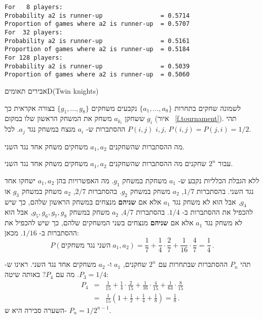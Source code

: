 \sml{}
\begin{verbatim}
For   8 players:
Probability a2 is runner-up                = 0.5714
Proportion of games where a2 is runner-up  = 0.5707
For  32 players:
Probability a2 is runner-up                = 0.5161
Proportion of games where a2 is runner-up  = 0.5184
For 128 players:
Probability a2 is runner-up                = 0.5039
Proportion of games where a2 is runner-up  = 0.5060
\end{verbatim}


\begin{prob}{אבירים תאומים}{D}{(Twin knights)}

לשמונה שחקים בתחרות 
$\{a_1,\ldots,a_8\}$
נקבעים משחקים 
$\{g_1,\ldots,g_8\}$
בצורה אקראית כך ששחקן
$a_{k_{i}}$
משחק את המשחק הראשון שלו במקום
$g_{i}$
(איור%
~\ref{f.tournament}).
תהי
$P(i,j)$
ההסתברות ש-%
$a_i$
מנצח במשחק נגד 
$a_j$.
לכל
$i,j$, $P(i,j)=P(j,i)=1/2$.

מה ההסתברות שהשחקנים
$a_1,a_2$
משחקים משחק אחד נגד השני.

עבור
$2^n$ 
שחקנים מה ההסתברות שהשחקנים
$a_1,a_2$
משחקים משחק אחד נגד השני.
\end{prob}

\solution{}

ללא הגבלת הכלליות נקבע ש-%
$a_1$
משחקת במשחק
$g_1$.
מה האפשרויות בהן 
$a_1,a_2$
ישחקו אחד נגד השני. בהסתברות 
$1/7$,
$a_2$
משחק במשחק
$g_2$.
בהסתברות
$2/7$,
$a_2$
משחק במשחק 
$g_3$
או
$g_4$,
אבל הוא לא משחק נגד 
$a_1$
אלא אם
\textbf{שניהם}
מנצחים במשחק הראשון שלהם, כך שיש להכפיל את ההסתברות ב-%
$1/4$.
בהסתברות
$4/7$,
$a_2$
משחק במשחק
$g_5,g_6,g_7,g_8$, 
אבל הוא לא משחק נגד 
$a_1$
אלא אם
\textbf{שניהם}
מנצחים בשני המשחקים שלהם, כך שיש להכפיל את ההסתברות ב-%
$1/16$.
מכאן:
\[
P(\textrm{השני נגד משחקים}\;a_1, a_2)=\frac{1}{7} + \frac{1}{4}\cdot \frac{2}{7} + \frac{1}{16}\cdot \frac{4}{7} =\frac{1}{4}\,.
\]


תהי 
$P_n$
ההסתברות שבתחרות עם 
$2^n$
שחקנים,
$a_1$
ו-%
$a_2$
משחקים אחד נגד השני. ראינו ש-%
$P_3=1/4$.
מה עם
$P_4$?
באותה שיטה:
\begin{eqnarray*}
P_4 &=& \frac{1}{15} + \frac{1}{4}\cdot \frac{2}{15}  + \frac{1}{16}\cdot \frac{4}{15}  + \frac{1}{64}\cdot \frac{8}{15} \\
&=&\frac{1}{15}\left(1+\frac{1}{2}+\frac{1}{4}+\frac{1}{8}\right)=\frac{1}{8}\,.
\end{eqnarray*}
השערה סבירה היא ש-%
$P_n=1/2^{n-1}$.

